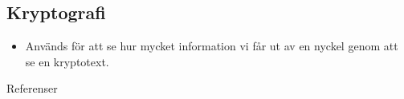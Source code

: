 \documentclass{beamer}
\theoremstyle{definition}
\begin{document}
\subsection{Kryptografi}

\begin{frame}{\insertsubsectionhead}
  \begin{itemize}
    \item Används för att se hur mycket information vi får ut av en nyckel 
      genom att se en kryptotext.
  \end{itemize}
\end{frame}



\begin{frame}[allowframebreaks]{Referenser}
	\small
  \printbibliography{}
\end{frame}
\end{document}
